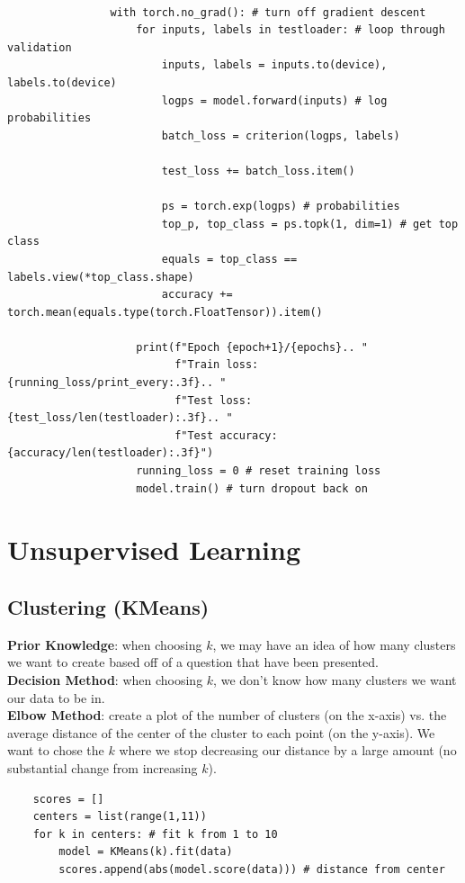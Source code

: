 \documentclass[11pt, a4paper]{article}
\begin{document}
\begin{spacing}{1.1}
	\begin{lstlisting}
	
				with torch.no_grad(): # turn off gradient descent
					for inputs, labels in testloader: # loop through validation
						inputs, labels = inputs.to(device), labels.to(device)
						logps = model.forward(inputs) # log probabilities
						batch_loss = criterion(logps, labels)
						
						test_loss += batch_loss.item()
						
						ps = torch.exp(logps) # probabilities
						top_p, top_class = ps.topk(1, dim=1) # get top class
						equals = top_class == labels.view(*top_class.shape)
						accuracy += torch.mean(equals.type(torch.FloatTensor)).item()
						
					print(f"Epoch {epoch+1}/{epochs}.. "
					      f"Train loss: {running_loss/print_every:.3f}.. "
					      f"Test loss: {test_loss/len(testloader):.3f}.. "
					      f"Test accuracy: {accuracy/len(testloader):.3f}")
					running_loss = 0 # reset training loss
					model.train() # turn dropout back on
	\end{lstlisting} \newpage

	\section{Unsupervised Learning}
	\subsection{Clustering (KMeans)}
	\textbf{Prior Knowledge}: when choosing $k$, we may have an idea of how many clusters we want to create based off of a question that have been presented. \vspace*{2mm}\\
	\textbf{Decision Method}: when choosing $k$, we don't know how many clusters we want our data to be in.\vspace*{2mm}\\
	\textbf{Elbow Method}: create a plot of the number of clusters (on the x-axis) vs. the average distance of the center of the cluster to each point (on the y-axis). We want to chose the $k$ where we stop decreasing our distance by a large amount (no substantial change from increasing $k$).
	\begin{lstlisting}
	scores = []
	centers = list(range(1,11))
	for k in centers: # fit k from 1 to 10
		model = KMeans(k).fit(data)
		scores.append(abs(model.score(data))) # distance from center
	

\end{lstlisting}
\end{spacing}
\end{document}
